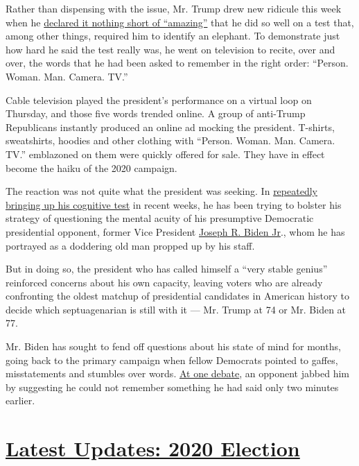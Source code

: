 Rather than dispensing with the issue, Mr. Trump drew new ridicule this
week when he
\href{https://www.nytimes.com/2020/07/22/us/politics/trump-cognitive-test-results.html}{declared
it nothing short of ``amazing''} that he did so well on a test that,
among other things, required him to identify an elephant. To demonstrate
just how hard he said the test really was, he went on television to
recite, over and over, the words that he had been asked to remember in
the right order: ``Person. Woman. Man. Camera. TV.''

Cable television played the president's performance on a virtual loop on
Thursday, and those five words trended online. A group of anti-Trump
Republicans instantly produced an online ad mocking the president.
T-shirts, sweatshirts, hoodies and other clothing with ``Person. Woman.
Man. Camera. TV.'' emblazoned on them were quickly offered for sale.
They have in effect become the haiku of the 2020 campaign.

The reaction was not quite what the president was seeking. In
\href{https://www.nytimes.com/2020/07/10/us/politics/trump-cognitive-test-health.html}{repeatedly
bringing up his cognitive test} in recent weeks, he has been trying to
bolster his strategy of questioning the mental acuity of his presumptive
Democratic presidential opponent, former Vice President
\href{https://www.nytimes.com/2020/07/24/business/joe-biden-stocks-taxes.html}{Joseph
R. Biden Jr}., whom he has portrayed as a doddering old man propped up
by his staff.

But in doing so, the president who has called himself a ``very stable
genius'' reinforced concerns about his own capacity, leaving voters who
are already confronting the oldest matchup of presidential candidates in
American history to decide which septuagenarian is still with it --- Mr.
Trump at 74 or Mr. Biden at 77.

Mr. Biden has sought to fend off questions about his state of mind for
months, going back to the primary campaign when fellow Democrats pointed
to gaffes, misstatements and stumbles over words.
\href{https://www.nytimes.com/2019/09/12/us/politics/castro-biden-memory-age-debate.html}{At
one debate}, an opponent jabbed him by suggesting he could not remember
something he had said only two minutes earlier.

\hypertarget{latest-updates-2020-election}{%
\section{\texorpdfstring{\href{https://www.nytimes.com/2020/07/31/us/elections/biden-vs-trump.html?action=click\&pgtype=Article\&state=default\&region=MAIN_CONTENT_1\&context=storylines_live_updates}{Latest
Updates: 2020
Election}}{Latest Updates: 2020 Election}}\label{latest-updates-2020-election}}

